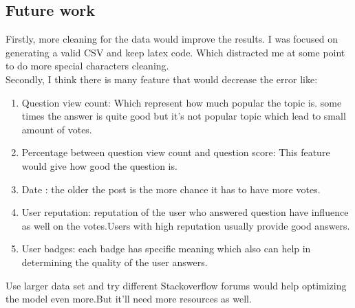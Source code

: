 \documentclass{article}
\begin{document}
\begin{multicols*}{2}
\begin{flushleft}
\section{Future work}
Firstly, more cleaning for the data would improve the results. I was focused on generating a valid CSV and keep latex code. Which distracted me at some point to do more special characters cleaning.\\
Secondly, I think there is many feature that would decrease the error like:
\begin{enumerate}
\item Question view count: Which represent how much popular the topic is. some times the answer is quite good but it's not popular topic which lead to small amount of votes.
\item Percentage between question view count and question score: This feature would give how good the question is.
\item Date : the older the post is the more chance it has to have more votes.
\item User reputation: reputation of the user who answered question have influence as well on the votes.Users with high reputation usually provide good answers. 
\item User badges: each badge has specific meaning which also can help in determining the quality of the user answers.
\end{enumerate}
Use larger data set and try different Stackoverflow forums would help optimizing the model even more.But it'll need more resources as well.

\end{flushleft}
\end{multicols*}
\end{document}
